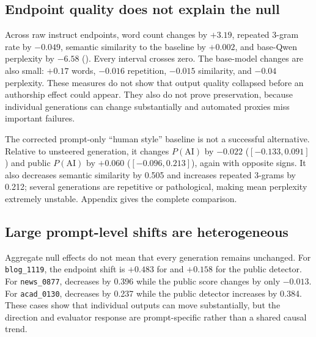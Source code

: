 \subsection{Endpoint quality does not explain the null}



Across raw instruct endpoints, word count changes by $+3.19$, repeated 3-gram rate by $-0.049$, semantic similarity to the baseline by $+0.002$, and base-Qwen perplexity by $-6.58$ (). Every interval crosses zero. The base-model changes are also small: $+0.17$ words, $-0.016$ repetition, $-0.015$ similarity, and $-0.04$ perplexity. These measures do not show that output quality collapsed before an authorship effect could appear. They also do not prove preservation, because individual generations can change substantially and automated proxies miss important failures.

The corrected prompt-only ``human style'' baseline is not a successful alternative. Relative to unsteered generation, it changes \mage $P(\mathrm{AI})$ by $-0.022$ ($[-0.133,0.091]$) and public $P(\mathrm{AI})$ by $+0.060$ ($[-0.096,0.213]$), again with opposite signs. It also decreases semantic similarity by 0.505 and increases repeated 3-grams by 0.212; several generations are repetitive or pathological, making mean perplexity extremely unstable. Appendix  gives the complete comparison.

\subsection{Large prompt-level shifts are heterogeneous}

Aggregate null effects do not mean that every generation remains unchanged. For \texttt{blog\_1119}, the endpoint shift is $+0.483$ for \mage and $+0.158$ for the public detector. For \texttt{news\_0877}, \mage decreases by 0.396 while the public score changes by only $-0.013$. For \texttt{acad\_0130}, \mage decreases by 0.237 while the public detector increases by 0.384. These cases show that individual outputs can move substantially, but the direction and evaluator response are prompt-specific rather than a shared causal trend.

